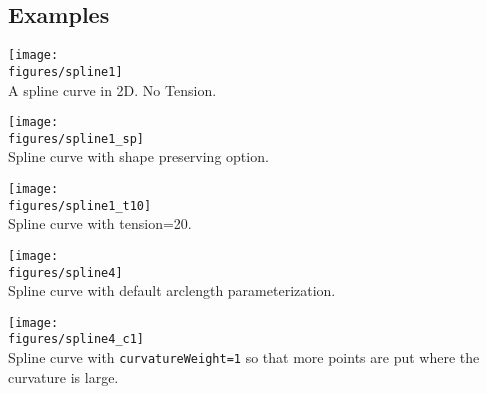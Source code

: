 
\subsection{Examples}

\noindent
\begin{minipage}{.4\linewidth}
{\footnotesize
{}
}
\end{minipage}\hfill
\begin{minipage}{.6\linewidth}
  \begin{center}
   \texttt{[image: \\figures/spline1]} \\
  {A spline curve in 2D. No Tension.}
  \end{center}
\end{minipage}


\begin{minipage}{.5\linewidth}
  \begin{center}
   \texttt{[image: \\figures/spline1\_sp]} \\
  {Spline curve with shape preserving option.}
  \end{center}
\end{minipage}
\begin{minipage}{.5\linewidth}
  \begin{center}
   \texttt{[image: \\figures/spline1\_t10]} \\
  {Spline curve with tension=20.}
  \end{center}
\end{minipage}

\begin{minipage}{.5\linewidth}
  \begin{center}
   \texttt{[image: \\figures/spline4]} \\
  {Spline curve with default arclength parameterization.}
  \end{center}
\end{minipage}
\begin{minipage}{.5\linewidth}
  \begin{center}
   \texttt{[image: \\figures/spline4\_c1]} \\
  {Spline curve with {\tt curvatureWeight=1} so that more points are put where the curvature is large.}
  \end{center}
\end{minipage}
